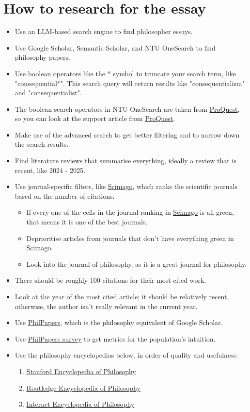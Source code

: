 \documentclass[11pt]{article}
\begin{document}
 \newpage
\section{How to research for the essay}
\label{sec:org75564cd}
\begin{itemize}
\item Use an LLM-based search engine to find philosopher essays.
\item Use Google Scholar, Semantic Scholar, and NTU OneSearch to find philosophy papers.
\item Use boolean operators like the * symbol to truncate your search term, like "consequential*". This search query will return results like "consequentialism" and "consequentialist".
\item The boolean search operators in NTU OneSearch are taken from \href{https://support.proquest.com/s/article/Search-Operators?language=en\_US}{ProQuest}, so you can look at the support article from \href{https://support.proquest.com/s/article/Search-Operators?language=en\_US}{ProQuest}.
\item Make use of the advanced search to get better filtering and to narrow down the search results.
\item Find literature reviews that summarise everything, ideally a review that is recent, like 2024 - 2025.
\item Use journal-specific filters, like \href{https://www.scimagojr.com/}{Scimago}, which ranks the scientific journals based on the number of citations.
\begin{itemize}
\item If every one of the cells in the journal ranking in \href{https://www.scimagojr.com/}{Scimago} is all green, that means it is one of the best journals.
\item Deprioritise articles from journals that don't have everything green in \href{https://www.scimagojr.com/}{Scimago}.
\item Look into the journal of philosophy, as it is a great journal for philosophy.
\end{itemize}
\item There should be roughly 100 citations for their most cited work.
\item Look at the year of the most cited article; it should be relatively recent, otherwise, the author isn't really relevant in the current year.
\item Use \href{https://philpapers.org/}{PhilPapers}, which is the philosophy equivalent of Google Scholar.
\item Use \href{https://philpapers.org/surveys/}{PhilPapers survey} to get metrics for the population's intuition.
\item Use the philosophy encyclopedias below, in order of quality and usefulness:
\begin{enumerate}
\item \href{https://plato.stanford.edu/}{Stanford Encyclopedia of Philosophy}
\item \href{https://www.rep.routledge.com/}{Routledge Encyclopedia of Philosophy}
\item \href{https://iep.utm.edu/}{Internet Encyclopedia of Philosophy}
\end{enumerate}
\end{itemize}
\end{document}
